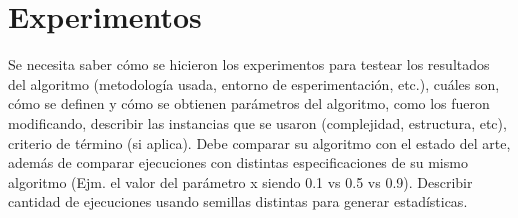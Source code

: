 \section{Experimentos}

Se necesita saber cómo se hicieron los experimentos para testear los resultados del algoritmo (metodología usada, entorno de esperimentación, etc.), cuáles son, cómo se definen y cómo se obtienen parámetros del algoritmo, como los fueron modificando, describir las instancias que se usaron (complejidad, estructura, etc), criterio de término (si aplica). Debe comparar su algoritmo con el estado del arte, además de comparar ejecuciones con distintas especificaciones de su mismo algoritmo (Ejm. el valor del parámetro x siendo 0.1 vs 0.5 vs 0.9). Describir cantidad de ejecuciones usando semillas distintas para generar estadísticas.
